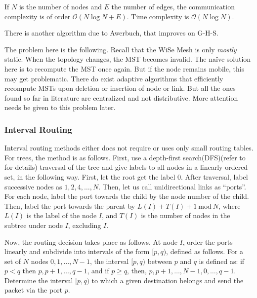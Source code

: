 \documentclass[fleqn,a4paper]{SelfArx}
\begin{document}
\par If $N$ is the number of nodes and $E$ the number of edges, the communication complexity is of order $\mathcal{O}(N\log N + E)$. 
Time complexity is $\mathcal{O}(N \log N)$.

\par There is another algorithm due to Awerbuch, \cite{Awerbuch:1987} that improves on G-H-S.

\par The problem here is the following. Recall that the WiSe Mesh is only \emph{mostly} static. When the topology changes, the MST
becomes invalid. The na\"ive solution here is to recompute the MST once again. But if the node remains mobile, this may get problematic.
There do exist adaptive algorithms that efficiently recompute MSTs upon deletion or insertion of node or link. But all the ones
found so far in literature are centralized and not distributive. More attention needs be given to this problem later.

\subsubsection{Interval Routing}\label{introuting}

\par Interval routing methods either does not require or uses only small routing tables. For trees, the method is as follows. First, use 
a depth-first search(DFS)(refer to \cite{Knuth:1997} for details) traversal of the tree and give labels to all nodes in a 
linearly ordered set, in the following way. First, let the root get the label $0$. After traversal, label successive nodes as $1, 2, 4, \ldots , N$. 
Then, let us call unidirectional links as ``ports''. For each node, label the port towards the child by the node number of the child.
Then, label the port towards the parent by $L(I) + T(I) +1\ \mathrm{mod}\ N$, where $L(I)$ is the label of the node $I$, and $T(I)$ is the
number of nodes in the subtree under node $I$, excluding $I$.

\par Now, the routing decision takes place as follows. At node $I$, order the ports linearly and subdivide into intervals of the form $[p, q)$,
defined as follows.  For a set of $N$ nodes $0, 1, \ldots , N-1$, the interval $[p,q)$ between $p$ and $q$ is defined as: if $p<q$ then 
$p, p+1, \ldots , q-1$, and if $p \geq q$, then, $p, p+1, \ldots , N-1, 0, \ldots , q-1$. Determine the interval $[p,q)$ to which a given 
destination belongs and send the packet via the port $p$.
\end{document}
